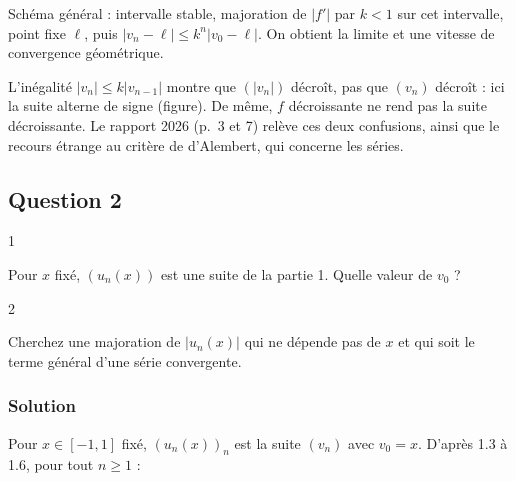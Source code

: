 \documentclass[11pt,a4paper]{article}
\newcommand{\equationajustee}[1]{%
  \sbox{\boiteequation}{$\displaystyle #1$}%
  \ifdim\wd\boiteequation>\linewidth
    \[\resizebox{\linewidth}{!}{\usebox{\boiteequation}}\]%
  \else
    \[#1\]%
  \fi}
\begin{document}
\begin{methode}

Schéma général : intervalle stable, majoration de \(|f'|\) par \(k<1\) sur cet intervalle, point fixe \(\ell\), puis \(|v_n-\ell|\le k^n|v_0-\ell|\). On obtient la limite et une vitesse de convergence géométrique.

\end{methode}

\begin{piege}

L'inégalité \(|v_n|\le k|v_{n-1}|\) montre que \((|v_n|)\) décroît, pas que \((v_n)\) décroît : ici la suite alterne de signe (figure). De même, \(f\) décroissante ne rend pas la suite décroissante. Le rapport 2026 (p.~3 et 7) relève ces deux confusions, ainsi que le recours étrange au critère de d'Alembert, qui concerne les séries.

\end{piege}

\hypertarget{question-2}{%
\subsection{Question 2}\label{question-2}}

\begin{indication}{1}

Pour \(x\) fixé, \((u_n(x))\) est une suite de la partie 1. Quelle valeur de \(v_0\) ?

\end{indication}

\begin{indication}{2}

Cherchez une majoration de \(|u_n(x)|\) qui ne dépende pas de \(x\) et qui soit le terme général d'une série convergente.

\end{indication}

\hypertarget{solution-19}{%
\subsubsection{Solution}\label{solution-19}}

Pour \(x\in[-1,1]\) fixé, \((u_n(x))_n\) est la suite \((v_n)\) avec \(v_0=x\). D'après 1.3 à 1.6, pour tout \(n\ge1\) :

\equationajustee{\begin{aligned}|u_n(x)|&\le k^{n-1}|u_1(x)|\\&\le k^{n-1}\ln2.\end{aligned}}
\end{document}
